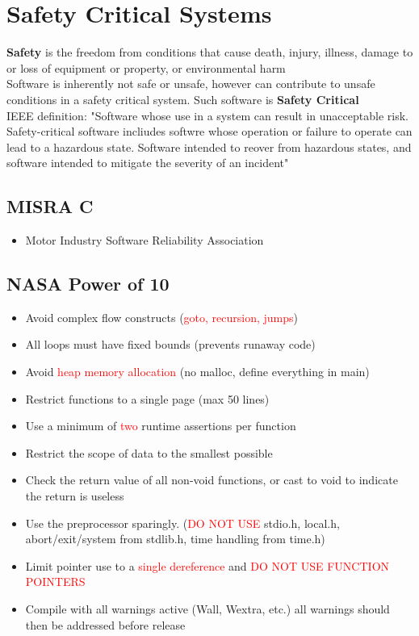 \documentclass[oneside]{book}
\begin{document}
    \chapter{Safety Critical Systems}
        \textbf{Safety} is the freedom from conditions that cause death, injury, illness, damage
        to or loss of equipment or property, or environmental harm\\
        Software is inherently not safe or unsafe, however can contribute to unsafe conditions in a
        safety critical system. Such software is \textbf{Safety Critical}\\
        IEEE definition: "Software whose use in a system can result in unacceptable risk. Safety-critical
        software incliudes softwre whose operation or failure to operate can lead to a hazardous state.
        Software intended to reover from hazardous states, and software intended to mitigate the severity
        of an incident"
        \section{MISRA C}
            \begin{itemize}
                \item Motor Industry Software Reliability Association
            \end{itemize}
        \section{NASA Power of 10}
            \begin{itemize}
                \item Avoid complex flow constructs (\textcolor{red}{goto, recursion, jumps})
                \item All loops must have fixed bounds (prevents runaway code)
                \item Avoid \textcolor{red}{heap memory allocation} (no malloc, define everything in main)
                \item Restrict functions to a single page (max 50 lines)
                \item Use a minimum of \textcolor{red}{two} runtime assertions per function
                \item Restrict the scope of data to the smallest possible
                \item Check the return value of all non-void functions, or cast to void to indicate the return is useless
                \item Use the preprocessor sparingly. (\textcolor{red}{DO NOT USE} stdio.h, local.h, abort/exit/system from stdlib.h, time handling from time.h)
                \item Limit pointer use to a \textcolor{red}{single dereference} and \textcolor{red}{DO NOT USE FUNCTION POINTERS}
                \item Compile with all warnings active (Wall, Wextra, etc.) all warnings should then be addressed before release
            \end{itemize}
\end{document}
